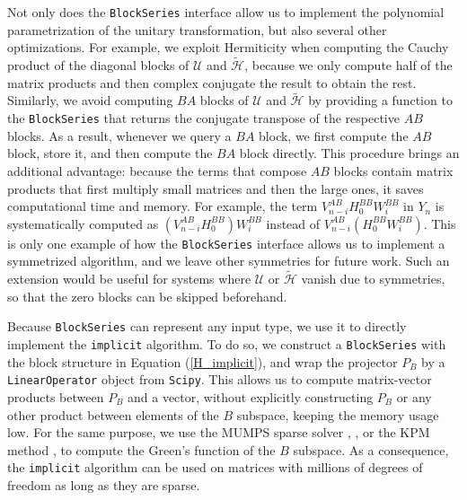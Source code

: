 Not only does the \texttt{BlockSeries} interface allow us to implement the polynomial
parametrization of the unitary transformation, but also several other
optimizations.
For example, we exploit Hermiticity when computing the Cauchy product of the
diagonal blocks of $\mathcal{U}$ and $\tilde{\mathcal{H}}$, because we only
compute half of the matrix products and then complex conjugate the result to
obtain the rest.
Similarly, we avoid computing $BA$ blocks of $\mathcal{U}$ and
$\tilde{\mathcal{H}}$ by providing a function to the \texttt{BlockSeries} that returns
the conjugate transpose of the respective $AB$ blocks.
As a result, whenever we query a $BA$ block, we first compute the $AB$ block,
store it, and then compute the $BA$ block directly.
This procedure brings an additional advantage: because the terms that compose
$AB$ blocks contain matrix products that first multiply small matrices and then
the large ones, it saves computational time and memory.
For example, the term $V_{n -i}^{AB} H_0^{BB}
W_i^{BB}$ in $Y_n$ is systematically computed as $(V_{n -i}^{AB}
H_0^{BB}) W_i^{BB}$ instead of $V_{n -i}^{AB}
(H_0^{BB} W_i^{BB})$.
This is only one example of how the \texttt{BlockSeries} interface allows us to
implement a symmetrized algorithm, and we leave other symmetries for future
work.
Such an extension would be useful for systems where $\mathcal{U}$ or
$\tilde{\mathcal{H}}$ vanish due to symmetries, so that the zero blocks can be
skipped beforehand.

Because \texttt{BlockSeries} can represent any input type, we use it to directly
implement the \texttt{implicit} algorithm.
To do so, we construct a \texttt{BlockSeries} with the block structure in Equation
(\ref{H_implicit}), and wrap the projector $P_B$ by a \texttt{LinearOperator} object
from \texttt{Scipy}.
This allows us to compute matrix-vector products between $P_B$ and a vector,
without explicitly constructing $P_B$ or any other product between elements of
the $B$ subspace, keeping the memory usage low.
For the same purpose, we use the MUMPS sparse solver
\cite{Amestoy_2001},
\cite{Amestoy_2006}, or the KPM method
\cite{Wei_e_2006}, to compute the Green's function of the
$B$ subspace.
As a consequence, the \texttt{implicit} algorithm can be used on matrices with
millions of degrees of freedom as long as they are sparse.

